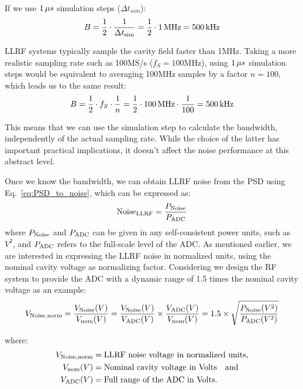 \documentclass[a4paper,12pt]{article}
\begin{document}
\noindent If we use $1\thinspace\mu s$ simulation steps ($\Delta t_{sim}$):
\begin{equation}
  \centering B = \frac{1}{2} \cdot \frac{1}{\Delta t_{\rm sim}}=\frac{1}{2} \cdot 1\thinspace {\rm MHz} = 500\thinspace {\rm kHz}
\end{equation}

LLRF systems typically sample the cavity field faster than 1\thinspace MHz. Taking a more realistic sampling rate such as 100\thinspace MS/s ($f_S=100$\thinspace MHz), using $1\thinspace\mu s$ simulation steps would be equivalent to averaging 100\thinspace MHz samples by a factor $n=100$, which leads us to the same result:
\begin{equation}
  \centering B = \frac{1}{2} \cdot f_S \cdot \frac{1}{n} = \frac{1}{2} \cdot 100\thinspace{\rm MHz} \cdot \frac{1}{100} = 500\thinspace{\rm kHz}
\end{equation}

\noindent This means that we can use the simulation step to calculate the bandwidth, independently of the actual sampling rate.  While the choice of the latter has important practical implications, it doesn't affect the noise performance at this abstract level.

Once we know the bandwidth, we can obtain LLRF noise from the PSD using Eq.~\eqref{eq:PSD_to_noise}, which can be expressed as:
\begin{equation}
  \centering {\rm Noise}_{\rm LLRF} = \frac{P_{\rm Noise}}{P_{\rm ADC}}
  \label{eq:dBc_def}
\end{equation}
where $P_{\rm Noise}$ and $P_{\rm ADC}$ can be given in any self-consistent power units, such as $V^2$,
and $P_{\rm ADC}$ refers to the full-scale level of the \hbox{ADC}.
As mentioned earlier, we are interested in expressing the LLRF noise in normalized units, using the nominal cavity voltage as normalizing factor. Considering we design the RF system to provide the ADC with a dynamic range of 1.5 times the nominal cavity voltage as an example:
\begin{equation}
 \centering V_{\rm Noise, norm} = \frac{V_{\rm Noise}(V)}{V_{\rm nom}(V)} = \frac{V_{\rm Noise}(V)}{V_{\rm ADC}(V)} \times \frac{V_{\rm ADC}(V)}{V_{\rm nom}(V)}=1.5 \times \sqrt{\frac{P_{\rm Noise}(V^2)}{P_{\rm ADC}(V^2)}}
 \label{eq:v_noise_norm_def}
\end{equation}

\noindent where:
\begin{align*}
V_{\rm Noise,norm} &= \mbox{LLRF noise voltage in normalized units,}\\
V_{\rm nom}(V)        &= \mbox{Nominal cavity voltage in Volts} \quad \mbox{and}\\
V_{\rm ADC}(V)       &= \mbox{Full range of the ADC in Volts}.
\end{align*}
\end{document}
